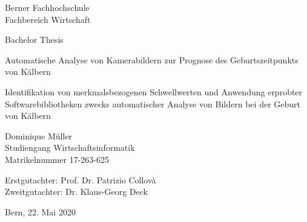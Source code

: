 
\begin{titlepage}
	
	\begin{center}

		\small{\hspace{2cm}Berner Fachhochschule\\
			\hspace{2cm}Fachbereich Wirtschaft\\}
		
		\vspace{0.75cm}
		\large{\hspace{2cm}\textrm{Bachelor Thesis }}
		\vspace{0.75cm}
		
		\Huge{\hspace{2cm} Automatische Analyse von Kamerabildern zur Prognose des Geburtszeitpunkts von Kälbern\\}
		
		\vspace{1cm}
		\LARGE{\hspace{2cm}Identifikation von merkmalsbezogenen Schwellwerten und  Anwendung erprobter Softwarebibliotheken zwecks automatischer Analyse von Bildern bei der Geburt von Kälbern   \\
		\vspace{1.75cm}	
			
			
			\LARGE{\hspace{2cm}Dominique Müller}\\
			\vspace{1cm}
			\large{\hspace{2cm}Studiengang Wirtschaftsinformatik\\
				\hspace{2cm}Matrikelnummer 17-263-625}
			
			\vspace{1cm}
			\large\hspace{2cm}Erstgutachter: Prof. Dr. Patrizio Collovà\\
			\large\hspace{2cm}Zweitgutachter: Dr. Klaus-Georg Deck\\}
			\vspace{1cm}
			
			\hspace{2cm} \large{Bern, 22. Mai 2020} \\

		
		
	\end{center}
	
\end{titlepage}

